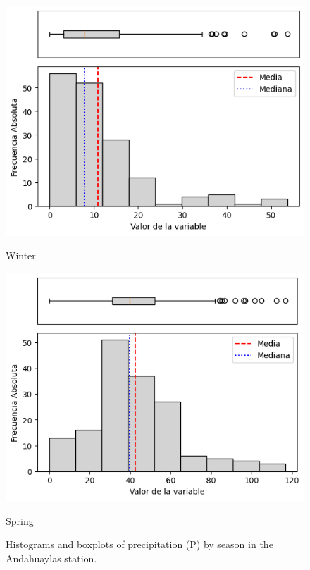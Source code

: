 \begin{figure}[htbp]
\vspace{0.2cm}

\begin{minipage}{0.30\textwidth}
  \includegraphics[width=\linewidth]{resultados/por_estacion_del_anio/boxplot_clases_por_estacion/Andahuaylas/P_HistBoxplot_Winter.png}
  \caption*{Winter}
\end{minipage}
\hfill
\begin{minipage}{0.30\textwidth}
  \includegraphics[width=\linewidth]{resultados/por_estacion_del_anio/boxplot_clases_por_estacion/Andahuaylas/P_HistBoxplot_Spring.png}
  \caption*{Spring}
\end{minipage}
\caption{Histograms and boxplots of precipitation (P) by season in the Andahuaylas station.}
\label{fig:andahuaylas_p_hist}
\end{figure}

